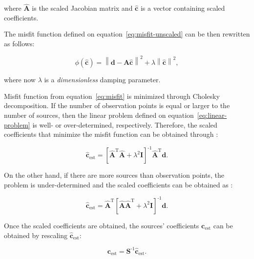 \documentclass[twocolumn]{article}
\newcommand{\inv}{^{\text{-}1}}
\begin{document}
\noindent where $\hat{\mathbf{A}}$ is the scaled Jacobian matrix and
$\hat{\mathbf{c}}$ is a vector containing scaled coefficients.

The misfit function defined on equation~\ref{eq:misfit-unscaled} can be then
rewritten as follows:

\begin{equation}
    \phi(\hat{\mathbf{c}}) =
        \left\lVert \mathbf{d}
        - \hat{\mathbf{A}}\hat{\mathbf{c}} \right\rVert ^ 2
        + \lambda \left\lVert \hat{\mathbf{c}} \right\rVert ^2,
    \label{eq:misfit}
\end{equation}

\noindent where now $\lambda$ is a \emph{dimensionless} damping parameter.

Misfit function from equation~\ref{eq:misfit} is minimized through Cholesky
decomposition.
If the number of observation points is equal or larger to the number of
sources, then the linear problem defined on equation~\ref{eq:linear-problem} is
well- or over-determined, respectively. Therefore, the scaled coefficients that
minimize the misfit function can be obtained through \citep{menke1989}:

\begin{equation}
    \hat{\mathbf{c}}_\text{est} =
        \left[
            \hat{\mathbf{A}}^\text{T} \hat{\mathbf{A}}
            + \lambda^2 \mathbf{I}
        \right]\inv
        \hat{\mathbf{A}}^\text{T}
        \mathbf{d}.
\end{equation}

On the other hand, if there are more sources than observation points, the
problem is under-determined and the scaled coefficients can be obtained as
\citep{menke1989}:

\begin{equation}
    \hat{\mathbf{c}}_\text{est} =
    \hat{\mathbf{A}}^\text{T}
        \left[
            \hat{\mathbf{A}} \hat{\mathbf{A}}^\text{T}
            + \lambda^2 \mathbf{I}
        \right]\inv
        \mathbf{d}.
\end{equation}


Once the scaled coefficients are obtained, the sources' coefficients
$\mathbf{c}_\text{est}$ can be obtained by rescaling
$\hat{\mathbf{c}}_\text{est}$:

\begin{equation}
    \mathbf{c}_\text{est} = \mathbf{S}\inv \hat{\mathbf{c}}_\text{est}.
\end{equation}
\end{document}
